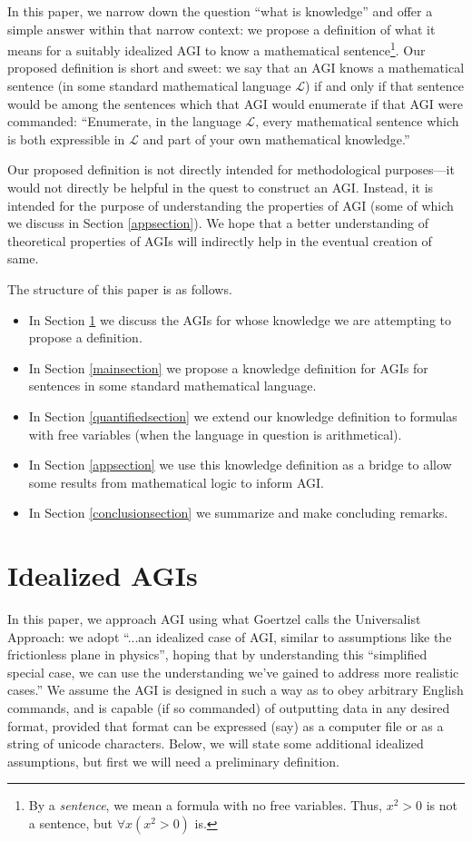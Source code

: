\documentclass[runningheads]{llncs}
\begin{document}
In this paper, we narrow down the question ``what is knowledge'' and offer
a simple answer within that narrow context:
we propose a definition of what it means for a suitably idealized AGI to know
a mathematical sentence\footnote{By a \emph{sentence}, we mean a formula with
no free variables. Thus, $x^2>0$ is not a sentence, but
$\forall x (x^2>0)$ is.}. Our proposed definition is short and
sweet: we say that
an AGI knows a mathematical sentence (in some standard mathematical language $\mathscr L$)
if and only if that sentence would be among the sentences which that AGI would
enumerate if that AGI were commanded:
``Enumerate, in the language $\mathscr L$, every mathematical sentence which
is both expressible in $\mathscr L$ and part of your own mathematical knowledge.''

Our proposed definition is not directly intended
for methodological purposes---it would not
directly be helpful in the quest to construct an AGI. Instead, it is intended for
the purpose of understanding the properties of AGI (some of which
we discuss in Section \ref{appsection}). We hope that a better
understanding of theoretical properties of AGIs will indirectly help in the eventual
creation of same.

The structure of this paper is as follows.
\begin{itemize}
  \item In Section \ref{agisection} we discuss the AGIs for whose knowledge we are
  attempting to propose a definition.
  \item In Section \ref{mainsection} we propose a knowledge definition for
  AGIs for sentences in some standard mathematical language.
  \item In Section \ref{quantifiedsection} we extend our knowledge definition
  to formulas with free variables (when the
  language in question is arithmetical).
  \item In Section \ref{appsection} we use this knowledge definition as a bridge
  to allow some results from mathematical logic to inform AGI.
  \item In Section \ref{conclusionsection} we summarize and make concluding remarks.
\end{itemize}

\section{Idealized AGIs}
\label{agisection}



In this paper, we approach AGI using what
Goertzel \cite{goertzel2014artificial} calls
the Universalist Approach:
we adopt ``...an idealized case of AGI, similar to
assumptions like the frictionless plane in physics'', hoping that by
understanding this ``simplified special
case, we can use the understanding we've gained to address more realistic
cases.'' We assume the AGI is designed in such a way as to obey arbitrary
English commands, and is capable (if so commanded) of outputting data in
any desired format, provided that format can be expressed (say) as a computer
file or as a string of unicode characters. Below, we will state some additional
idealized assumptions, but first we will need a preliminary definition.
\end{document}
